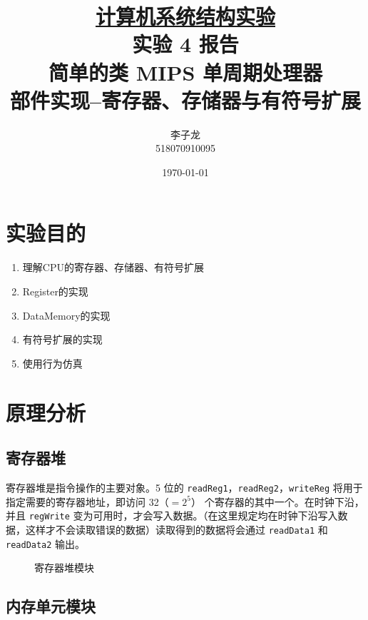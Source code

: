 \documentclass[a4paper,UTF8]{ctexart}
\begin{document}
\title{\normalsize \underline{计算机系统结构实验}\\\LARGE 实验 4 报告\\\vspace*{1em}\normalsize 简单的类 MIPS 单周期处理器\\部件实现--寄存器、存储器与有符号扩展}
\author{李子龙\\ 518070910095}
\date{\today}
\maketitle
\tableofcontents
\clearpage

\section{实验目的}

\begin{enumerate}
    \item 理解CPU的寄存器、存储器、有符号扩展
    \item Register的实现
    \item DataMemory的实现
    \item 有符号扩展的实现
    \item 使用行为仿真
\end{enumerate}

\section{原理分析}

\subsection{寄存器堆}

寄存器堆是指令操作的主要对象。5 位的 \verb"readReg1"，\verb"readReg2"，\verb"writeReg" 将用于指定需要的寄存器地址，即访问 32（$=2^5$） 个寄存器的其中一个。在时钟下沿，并且 \verb"regWrite" 变为可用时，才会写入数据。（在这里规定均在时钟下沿写入数据，这样才不会读取错误的数据）读取得到的数据将会通过 \verb"readData1" 和 \verb"readData2" 输出。

\begin{figure}[h]
    \centering
    
    \caption{寄存器堆模块}
\end{figure}

\subsection{内存单元模块}
\end{document}
